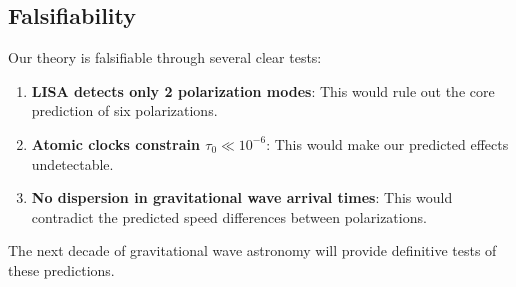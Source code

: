 \subsection{Falsifiability}

Our theory is falsifiable through several clear tests:

\begin{enumerate}
    \item \textbf{LISA detects only 2 polarization modes}: This would rule out the core prediction of six polarizations.
    
    \item \textbf{Atomic clocks constrain $\tau_0 \ll 10^{-6}$}: This would make our predicted effects undetectable.
    
    \item \textbf{No dispersion in gravitational wave arrival times}: This would contradict the predicted speed differences between polarizations.
\end{enumerate}

The next decade of gravitational wave astronomy will provide definitive tests of these predictions.
